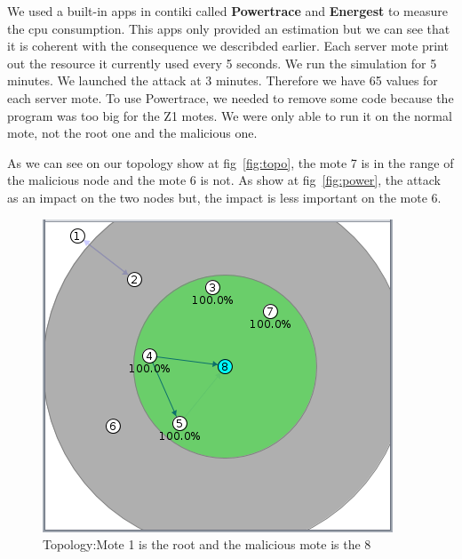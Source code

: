 \documentclass{report}
\begin{document}
We used a built-in apps in contiki called \textbf{Powertrace} and
\textbf{Energest} to measure the cpu consumption. This apps only
provided an estimation but we can see that it is coherent with the
consequence we describded earlier. Each server mote print out the
resource it currently used every 5 seconds. We run the simulation for 5
minutes. We launched the attack at 3 minutes. Therefore we have 65
values for each server mote. To use Powertrace, we needed to remove some
code because the program was too big for the Z1 motes. We were only able
to run it on the normal mote, not the root one and the malicious one. 

As we can see on our topology show at fig~\ref{fig:topo}, the mote 7 is
in the range of the malicious node and the mote
6 is not. As show at fig~\ref{fig:power}, the attack as an impact on the two nodes but, the impact is less important
on the mote 6.


\begin{figure}[ht!]
    \centering
    \includegraphics[scale=0.55]{img/simulation_measurement}
    \caption{Topology:Mote 1 is the root and the malicious mote is the 8}
\end{figure}
\end{document}
